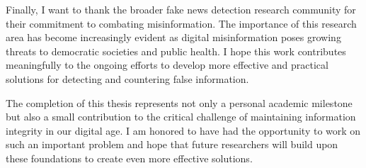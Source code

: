 Finally, I want to thank the broader fake news detection research community for their commitment to combating misinformation. The importance of this research area has become increasingly evident as digital misinformation poses growing threats to democratic societies and public health. I hope this work contributes meaningfully to the ongoing efforts to develop more effective and practical solutions for detecting and countering false information.

The completion of this thesis represents not only a personal academic milestone but also a small contribution to the critical challenge of maintaining information integrity in our digital age. I am honored to have had the opportunity to work on such an important problem and hope that future researchers will build upon these foundations to create even more effective solutions.

\EndAcknowledgments
